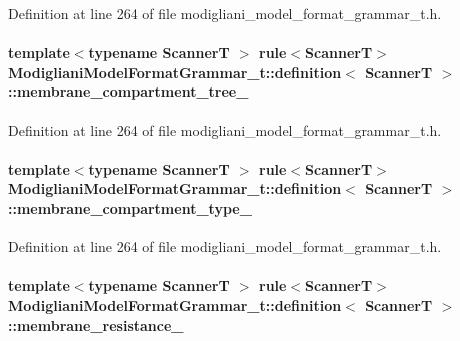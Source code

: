 Definition at line 264 of file modigliani\_\-model\_\-format\_\-grammar\_\-t.h.

\paragraph[{membrane\_\-compartment\_\-tree\_\-}]{\setlength{\rightskip}{0pt plus 5cm}template$<$typename ScannerT $>$ rule$<$ScannerT$>$ {\bf ModiglianiModelFormatGrammar\_\-t::definition}$<$ ScannerT $>$::{\bf membrane\_\-compartment\_\-tree\_\-}}\hfill\label{struct_modigliani_model_format_grammar__t_1_1definition_a550df22f0faac0b42234950bcd3fc16b}


Definition at line 264 of file modigliani\_\-model\_\-format\_\-grammar\_\-t.h.

\paragraph[{membrane\_\-compartment\_\-type\_\-}]{\setlength{\rightskip}{0pt plus 5cm}template$<$typename ScannerT $>$ rule$<$ScannerT$>$ {\bf ModiglianiModelFormatGrammar\_\-t::definition}$<$ ScannerT $>$::{\bf membrane\_\-compartment\_\-type\_\-}}\hfill\label{struct_modigliani_model_format_grammar__t_1_1definition_ac3336f617b1e498a7def14ff1c96a471}


Definition at line 264 of file modigliani\_\-model\_\-format\_\-grammar\_\-t.h.

\paragraph[{membrane\_\-resistance\_\-}]{\setlength{\rightskip}{0pt plus 5cm}template$<$typename ScannerT $>$ rule$<$ScannerT$>$ {\bf ModiglianiModelFormatGrammar\_\-t::definition}$<$ ScannerT $>$::{\bf membrane\_\-resistance\_\-}}\hfill\label{struct_modigliani_model_format_grammar__t_1_1definition_a4c2ce9292a0e70e3cf7f0956c2a1f2cb}


